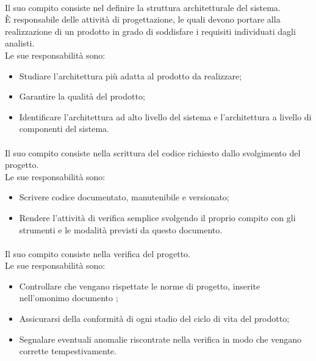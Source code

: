 \paragraph{\roleDesigner}
Il suo compito consiste nel definire la struttura architetturale del sistema.\\
È responsabile delle attività di progettazione, le quali devono portare alla realizzazione di un prodotto in grado di soddisfare i requisiti individuati dagli analisti.\\
Le sue responsabilità sono:
\begin{itemize}
  \item Studiare l'architettura più adatta al prodotto da realizzare;
  \item Garantire la qualità del prodotto;
  \item Identificare l'architettura ad alto livello del sistema e l'architettura a livello di componenti del sistema.
\end{itemize}

\paragraph{\roleProgrammer}
Il suo compito consiste nella scrittura del codice richiesto dallo svolgimento del progetto.\\
Le sue responsabilità sono:
\begin{itemize}
  \item Scrivere codice documentato, manutenibile e versionato;
  \item Rendere l'attività di verifica semplice svolgendo il proprio compito con gli strumenti e le modalità previsti da questo documento.
\end{itemize}

\paragraph{\roleVerifier}
Il suo compito consiste nella verifica del progetto.\\
Le sue responsabilità sono:
\begin{itemize}
  \item Controllare che vengano rispettate le norme di progetto, inserite nell'omonimo documento \docNameVersionNdP{};
  \item Assicurarsi della conformità di ogni stadio del ciclo di vita\glo{} del prodotto;
  \item Segnalare eventuali anomalie riscontrate nella verifica in modo che vengano corrette tempestivamente.
\end{itemize}
